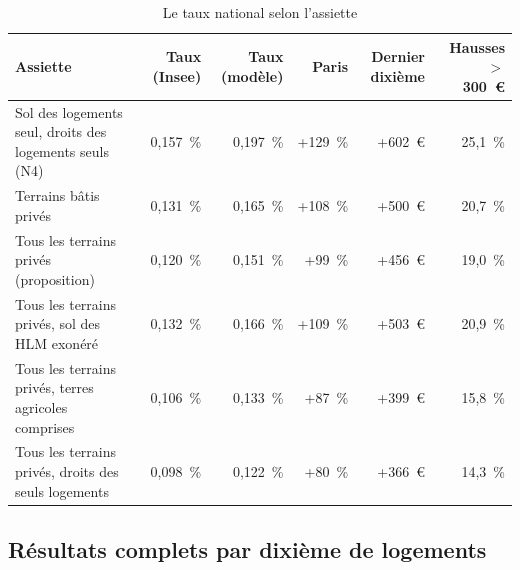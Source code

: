 \documentclass[11pt,a4paper]{article}
\begin{document}
\begin{table}[!htbp]\centering\scriptsize
\caption{Le taux national selon l'assiette}\label{tab:fon_sens}
\begin{tabularx}{\linewidth}{@{}>{\raggedright\arraybackslash}X rrrrr@{}}
\toprule
Assiette & Taux (Insee) & Taux (modèle) & Paris & Dernier dixième & Hausses $>$ 300~€ \\
\midrule
Sol des logements seul, droits des logements seuls (N4) & 0,157~\% & 0,197~\% & +129~\% & +602~€ & 25,1~\% \\
Terrains bâtis privés & 0,131~\% & 0,165~\% & +108~\% & +500~€ & 20,7~\% \\
Tous les terrains privés (proposition) & 0,120~\% & 0,151~\% & +99~\% & +456~€ & 19,0~\% \\
Tous les terrains privés, sol des HLM exonéré & 0,132~\% & 0,166~\% & +109~\% & +503~€ & 20,9~\% \\
Tous les terrains privés, terres agricoles comprises & 0,106~\% & 0,133~\% & +87~\% & +399~€ & 15,8~\% \\
Tous les terrains privés, droits des seuls logements & 0,098~\% & 0,122~\% & +80~\% & +366~€ & 14,3~\% \\
\bottomrule
\end{tabularx}
\par\vspace{2pt}{\raggedright\scriptsize Variation moyenne de la taxe des logements à Paris et dans le dixième le plus
cher ; sans réaction des ventes (avec 6~\% de ventes en plus par point, environ 18~\% de moins). Les terres agricoles
sont déjà soumises à la taxe sur le foncier non bâti.\par}
\end{table}

\subsection{Résultats complets par dixième de logements}
\end{document}
